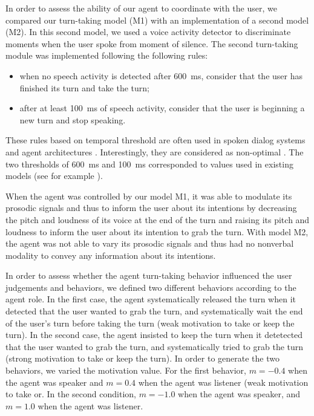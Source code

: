 In order to assess the ability of our agent to coordinate with the user, we compared our turn-taking model (M1) with an implementation of a second model (M2). 
In this second model, we used a voice activity detector to discriminate moments when the user spoke from moment of silence. 
The second turn-taking module was implemented following the following rules: 
\begin{itemize}
\item when no speech activity is detected after 600~ms, consider that the user has finished its turn and take the turn;
\item after at least 100~ms of speech activity, consider that the user is beginning a new turn and stop speaking. 
\end{itemize} 
These rules based on temporal threshold are often used in spoken dialog systems and agent architectures \citep{ward_root_2005}. Interestingly, they are considered as non-optimal \citep{ward_root_2005}. The two thresholds of 600~ms and 100~ms corresponded to values used in existing models (see for example \citep{ferrer_is_2002}). 

When the agent was controlled by our model M1, it was able to modulate its prosodic signals and thus to inform the user about its intentions by decreasing the pitch and loudness of its voice at the end of the turn and raising its pitch and loudness to inform the user about its intention to grab the turn.  
With model M2, the agent was not able to vary its prosodic signals and thus had no nonverbal modality to convey any information about its intentions. 

In order to assess whether the agent turn-taking behavior influenced the user judgements and behaviors, we defined two different behaviors according to the agent role. In the first case, the agent systematically released the turn when it detected that the user wanted to grab the turn, and systematically wait the end of the user's turn before taking the turn (weak motivation to take or keep the turn). In the second case, the agent insisted to keep the turn when it detetected that the user wanted to grab the turn, and systematically tried to grab the turn (strong motivation to take or keep the turn). In order to generate the two behaviors, we varied the motivation value. For the first behavior, $m=-0.4$ when the agent was speaker and $m=0.4$ when the agent was listener (weak motivation to take or. In the second condition, $m=-1.0$ when the agent was speaker, and $m=1.0$ when the agent was listener.

